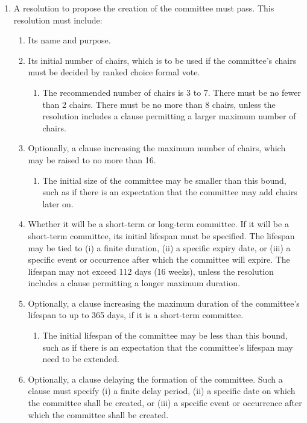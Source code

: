 \documentclass[11pt]{article}
\newcounter{h1}
\newcounter{h2}[h1]
\newcounter{h3}[h2]
\begin{document}
\begin{enumerate}
  \item A resolution to propose the creation of the committee must pass. This resolution must include:
  \begin{enumerate}
    \item Its name and purpose.
    \item Its initial number of chairs, which is to be used if the committee's chairs must be decided by ranked choice formal vote.
    \begin{enumerate}
      \item The recommended number of chairs is 3 to 7. There must be no fewer than 2 chairs. There must be no more than 8 chairs, unless the resolution includes a clause permitting a larger maximum number of chairs.
    \end{enumerate}
    \item Optionally, a clause increasing the maximum number of chairs, which may be raised to no more than 16.
    \begin{enumerate}
      \item The initial size of the committee may be smaller than this bound, such as if there is an expectation that the committee may add chairs later on.
    \end{enumerate}
    \item Whether it will be a short-term or long-term committee. If it will be a short-term committee, its initial lifespan must be specified. The lifespan may be tied to (i) a finite duration, (ii) a specific expiry date, or (iii) a specific event or occurrence after which the committee will expire. The lifespan may not exceed 112 days (16 weeks), unless the resolution includes a clause permitting a longer maximum duration.
    \item Optionally, a clause increasing the maximum duration of the committee's lifespan to up to 365 days, if it is a short-term committee.
    \begin{enumerate}
      \item The initial lifespan of the committee may be less than this bound, such as if there is an expectation that the committee's lifespan may need to be extended.
    \end{enumerate}
    \item Optionally, a clause delaying the formation of the committee. Such a clause must specify (i) a finite delay period, (ii) a specific date on which the committee shall be created, or (iii) a specific event or occurrence after which the committee shall be created.

\end{enumerate}
\end{enumerate}
\end{document}

